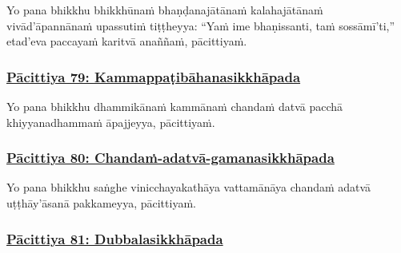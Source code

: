 Yo pana bhikkhu bhikkhūnaṁ bhaṇḍanajātānaṁ kalahajātānaṁ vivād'āpannānaṁ upassutiṁ\makeatletter\hyperlink{endnote404-appendix}\makeatother{} tiṭṭheyya: ``Yaṁ ime bhaṇissanti, taṁ sossāmī'ti,'' etad'eva paccayaṁ karitvā anaññaṁ, pācittiyaṁ.



\subsubsection*{\hyperref[exp79]{Pācittiya 79: Kammappaṭibāhanasikkhāpada}}
\label{pac79}

Yo pana bhikkhu dhammikānaṁ kammānaṁ chandaṁ datvā pacchā khiyyanadhammaṁ\makeatletter\hyperlink{endnote405-appendix}\makeatother{} āpajjeyya, pācittiyaṁ.



\subsubsection*{\hyperref[exp80]{Pācittiya 80: Chandaṁ-adatvā-gamanasikkhāpada}}
\label{pac80}

Yo pana bhikkhu saṅghe vinicchayakathāya vattamānāya chandaṁ adatvā uṭṭhāy'āsanā pakkameyya, pācittiyaṁ.



\subsubsection*{\hyperref[exp81]{Pācittiya 81: Dubbalasikkhāpada}}
\label{pac81}

